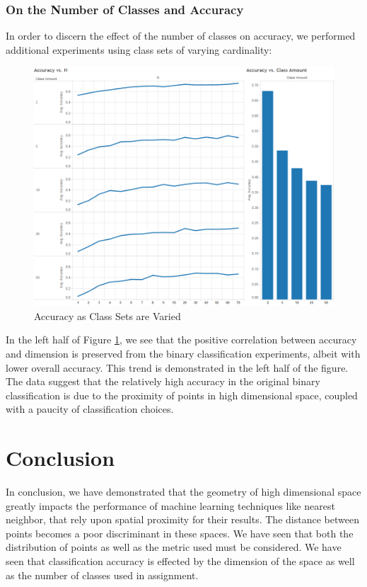 \documentclass{article}
\begin{document}
\subsubsection{On the Number of Classes and Accuracy}
In order to discern the effect of the number of classes on accuracy, we performed additional experiments using class sets of varying cardinality:
\begin{figure}[H]
    \centering
        \includegraphics[width=\textwidth]{exp1-2-varying_classes.png}
    \caption{Accuracy as Class Sets are Varied}\label{fig:exp1-2-varclass}
\end{figure}
In the left half of Figure \ref{fig:exp1-2-varclass}, we see that the positive correlation between accuracy and dimension is preserved from the binary classification experiments, albeit with lower overall accuracy. This trend is demonstrated in the left half of the figure. The data suggest that the relatively high accuracy in the original binary classification is due to the proximity of points in high dimensional space, coupled with a paucity of classification choices.
\section{Conclusion}
In conclusion, we have demonstrated that the geometry of high dimensional space greatly impacts the performance of machine learning techniques like nearest neighbor, that rely upon spatial proximity for their results. The distance between points becomes a poor discriminant in these spaces. We have seen that both the distribution of points as well as the metric used must be considered. We have seen that classification accuracy is effected by the dimension of the space as well as the number of classes used in assignment.
\
\end{document}
